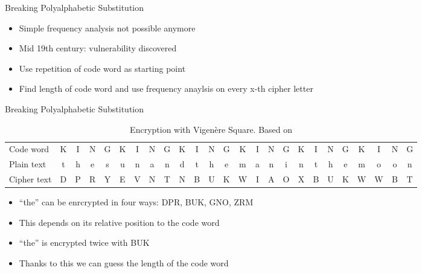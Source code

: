 \documentclass[]{beamer}
\begin{document}
\begin{frame}{Breaking Polyalphabetic Substitution}
	\begin{itemize}
		\item<1-> Simple frequency analysis not possible anymore
		\item<2-> Mid 19th century: vulnerability discovered
		\item<3-> Use repetition of code word as starting point
		\item<4-> Find length of code word and use frequency anaylsis on every x-th cipher letter
	\end{itemize}
\end{frame}

\begin{frame}{Breaking Polyalphabetic Substitution}
	\begin{table}
		\centering
		\resizebox{10.5cm}{!} {
			\begin{tabular}{l c c c c c c c c c c c c c c c c c c c c c c c c}
				\hline
				Code word &K&I&N&G&K&I&N&G&K&I&N&G&K&I&N&G&K&I&N&G&K&I&N&G\\
				Plain text &t&h&e&s&u&n&a&n&d&t&h&e&m&a&n&i&n&t&h&e&m&o&o&n \\
				Cipher text &D&P&R&Y&E&V&N&T&N&B&U&K&W&I&A&O&X&B&U&K&W&W&B&T\\
				\hline
			\end{tabular}
		}
		\caption{Encryption with Vigenère Square. Based on \cite{singh1999}}
	\end{table}
	\begin{itemize}
		\item<2-> ``the'' can be enrcrypted in four ways: DPR, BUK, GNO, ZRM
		\item<4-> This depends on its relative position to the code word
		\item<5-> ``the'' is encrypted twice with BUK
		\item<6-> Thanks to this we can guess the length of the code word
	\end{itemize}
\end{frame}
\end{document}
